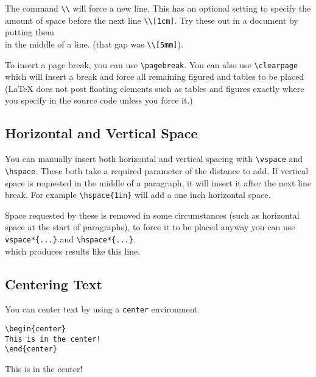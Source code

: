The command \verb|\\| will force a new line. This has an optional setting to specify the amount of space before the next line \verb|\\[1cm]|. Try these out in a document by putting them\\[5mm] in the middle of a line. (that gap was \verb|\\[5mm]|).

To insert a page break, you can use \verb|\pagebreak|. You can also use \verb|\clearpage| which will insert a break and force all remaining figured and tables to be placed (\LaTeX{} does not post floating elements such as tables and figures exactly where you specify in the source code unless you force it.)

\subsection*{Horizontal and Vertical Space}

You can manually insert both horizontal and vertical spacing with \verb|\vspace| and \verb|\hspace|. These both take a required parameter of the distance to add. If vertical space is requested in the middle of a paragraph, it will insert it after the next line break. For example \verb|\hspace{1in}|\hspace{1in} will add a one inch horizontal space.

Space requested by these is removed in some circumstances (such as horizontal space at the start of paragraphs), to force it to be placed anyway you can use \verb|vspace*{...}| and \verb|\hspace*{...}|.\\\hspace*{1in}which produces results like this line.

\subsection*{Centering Text}
You can center text by using a \verb|center| environment.

\begin{lstlisting}
\begin{center}
This is in the center!
\end{center}
\end{lstlisting}
\begin{center}
This is in the center!
\end{center}

